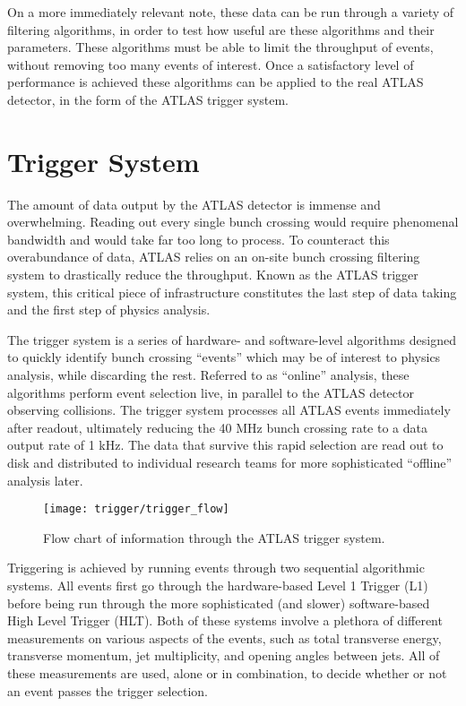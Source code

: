     On a more immediately relevant note, these data can be run through a variety of filtering algorithms,
        in order to test how useful are these algorithms and their parameters.
    These algorithms must be able to limit the throughput of events,
        without removing too many events of interest.
    Once a satisfactory level of performance is achieved these algorithms can be applied to the real ATLAS detector,
        in the form of the ATLAS trigger system.


\section{Trigger System} \label{sec:trigger}

    The amount of data output by the ATLAS detector is immense and overwhelming.
    Reading out every single bunch crossing would require phenomenal bandwidth and would take far too long to process.
    To counteract this overabundance of data, ATLAS relies on an on-site bunch crossing filtering system to drastically reduce the throughput.
    Known as the ATLAS trigger system, this critical piece of infrastructure constitutes the last step of data taking
        and the first step of physics analysis.

    The trigger system is a series of hardware- and software-level algorithms designed
        to quickly identify bunch crossing ``events'' which may be of interest to physics analysis,
        while discarding the rest.
    Referred to as ``online'' analysis, these algorithms perform event selection live,
        in parallel to the ATLAS detector observing collisions.
    The trigger system processes all ATLAS events immediately after readout,
        ultimately reducing the 40 MHz bunch crossing rate to a data output rate of 1 kHz.
    The data that survive this rapid selection are read out to disk
        and distributed to individual research teams for more sophisticated ``offline'' analysis later.

    \begin{figure}[h]
        \texttt{[image: trigger/trigger\_flow]}
        \caption{Flow chart of information through the ATLAS trigger system\cite{trigger_run2}.}
        \label{fig:trigger_flow}
    \end{figure}
    
    Triggering is achieved by running events through two sequential algorithmic systems.
    All events first go through the hardware-based Level 1 Trigger (L1) before being run through the more sophisticated (and slower) software-based High Level Trigger (HLT).
    Both of these systems involve a plethora of different measurements on various aspects of the events, such as total transverse energy, transverse momentum, jet multiplicity, and opening angles between jets.
    All of these measurements are used, alone or in combination, to decide whether or not an event passes the trigger selection.

